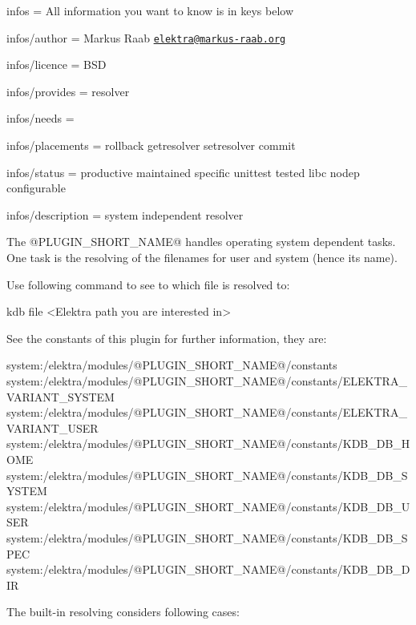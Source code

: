 
\begin{DoxyItemize}
\item infos = All information you want to know is in keys below
\item infos/author = Markus Raab \href{mailto:elektra@markus-raab.org}{\tt elektra@markus-\/raab.\+org}
\item infos/licence = B\+SD
\item infos/provides = resolver
\item infos/needs =
\item infos/placements = rollback getresolver setresolver commit
\item infos/status = productive maintained specific unittest tested libc nodep configurable
\item infos/description = system independent resolver
\end{DoxyItemize}

The {\ttfamily @P\+L\+U\+G\+I\+N\+\_\+\+S\+H\+O\+R\+T\+\_\+\+N\+A\+ME@} handles operating system dependent tasks. One task is the resolving of the filenames for user and system (hence its name).

Use following command to see to which file is resolved to\+:


\begin{DoxyCode}
kdb file <Elektra path you are interested in>
\end{DoxyCode}


See the constants of this plugin for further information, they are\+:


\begin{DoxyCode}
system:/elektra/modules/@PLUGIN\_SHORT\_NAME@/constants
system:/elektra/modules/@PLUGIN\_SHORT\_NAME@/constants/ELEKTRA\_VARIANT\_SYSTEM
system:/elektra/modules/@PLUGIN\_SHORT\_NAME@/constants/ELEKTRA\_VARIANT\_USER
system:/elektra/modules/@PLUGIN\_SHORT\_NAME@/constants/KDB\_DB\_HOME
system:/elektra/modules/@PLUGIN\_SHORT\_NAME@/constants/KDB\_DB\_SYSTEM
system:/elektra/modules/@PLUGIN\_SHORT\_NAME@/constants/KDB\_DB\_USER
system:/elektra/modules/@PLUGIN\_SHORT\_NAME@/constants/KDB\_DB\_SPEC
system:/elektra/modules/@PLUGIN\_SHORT\_NAME@/constants/KDB\_DB\_DIR
\end{DoxyCode}


The built-\/in resolving considers following cases\+:


